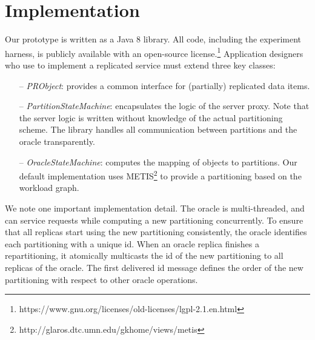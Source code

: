\section{Implementation}
\label{sec:implementation}


Our  \dynastar prototype is written as a
Java 8 library.
All code, including the experiment harness,
is publicly available with an open-source
license.\footnote{https://www.gnu.org/licenses/old-licenses/lgpl-2.1.en.html}
Application designers who use \dynastar
 to implement a replicated service must extend three key classes:
 \begin{itemize}
 \item[--] \emph{PRObject}: provides a common interface for (partially) replicated data items.
 \item[--] \emph{PartitionStateMachine}: encapsulates the logic of the server
   proxy. Note that the server logic is written without knowledge of the actual partitioning scheme. The \dynastar library
   handles all communication between partitions and the oracle transparently.
 \item[--] \emph{OracleStateMachine}: computes the mapping of objects to partitions.
Our default implementation uses METIS\footnote{http://glaros.dtc.umn.edu/gkhome/views/metis} to provide a partitioning based on the workload graph.
 \end{itemize}

 We note one important implementation detail.  The oracle is
 multi-threaded, and can service requests while computing a new
 partitioning concurrently. To ensure that all replicas start using
 the new partitioning consistently, the oracle identifies each
 partitioning with a unique id.  When an oracle replica finishes a
 repartitioning, it atomically multicasts the id of the new
 partitioning to all replicas of the oracle.  The first delivered id
 message defines the order of the new partitioning with respect to
 other oracle operations.



